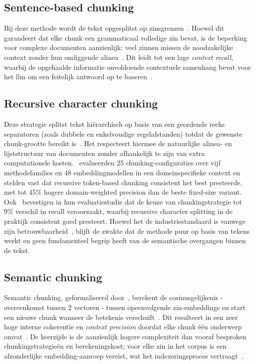 \subsection{Sentence-based chunking}

Bij deze methode wordt de tekst opgesplitst op zinsgrenzen~\autocite{Shaukat2026}. Hoewel dit garandeert dat elke chunk een grammaticaal volledige zin bevat, is de beperking voor complexe documenten aanzienlijk: veel zinnen missen de noodzakelijke context zonder hun omliggende alinea~\autocite{Glukhov2026,Shaukat2026}. Dit leidt tot een lage \textit{context recall}, waarbij de opgehaalde informatie onvoldoende contextuele samenhang bevat voor het \gls{llm} om een feitelijk antwoord op te baseren~\autocite{LatifEtAl2025}.

\subsection{Recursive character chunking}

Deze strategie splitst tekst hiërarchisch op basis van een geordende reeks separatoren (zoals dubbele en enkelvoudige regelafstanden) totdat de gewenste chunk-grootte bereikt is~\autocite{LangChain2024}. Het respecteert hiermee de natuurlijke alinea- en lijststructuur van documenten zonder afhankelijk te zijn van extra computationele kosten.~\textcite{Amiri2025} evalueerden 25 chunking-configuraties over vijf methodefamilies en 48 embeddingmodellen in een domeinspecifieke context en stelden vast dat recursive token-based chunking consistent het best presteerde, met tot 45\% hogere domain-weighted precision dan de beste fixed-size variant. Ook~\textcite{SmithTroynikov2024} bevestigen in hun evaluatiestudie dat de keuze van chunkingstrategie tot 9\% verschil in recall veroorzaakt, waarbij recursive character splitting in de praktijk consistent goed presteert. Hoewel het de industriestandaard is vanwege zijn betrouwbaarheid~\autocite{Amiri2025}, blijft de zwakte dat de methode puur op basis van tekens werkt en geen fundamenteel begrip heeft van de semantische overgangen binnen de tekst.

\subsection{Semantic chunking}

Semantic chunking, geformaliseerd door~\textcite{Kamradt2023}, berekent de cosinusgelijkenis - overeenkomst tussen 2 vectoren - tussen opeenvolgende zin-embeddings en start een nieuwe chunk wanneer de betekenis verschuift~\autocite{Kamradt2023,Taiwo2026}. Dit resulteert in een zeer hoge interne coherentie en \textit{context precision} doordat elke chunk één onderwerp omvat~\autocite{MorenoCediel2026,Bennani2026}. De keerzijde is de aanzienlijk hogere complexiteit dan vooraf besproken chunkingstrategieën en berekeningskost; voor elke zin in het corpus is een afzonderlijke embedding-aanroep vereist, wat het indexeringsproces vertraagt~\autocite{Glukhov2026}.


